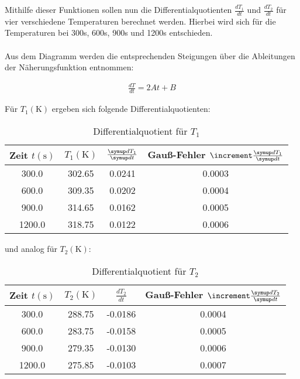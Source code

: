 Mithilfe dieser Funktionen sollen nun die Differentialquotienten $\frac{dT_{1}}{dt}$ und $\frac{dT_{2}}{dt}$ 
für vier verschiedene Temperaturen berechnet werden. Hierbei wird sich für die Temperaturen bei 
300s, 600s, 900s und 1200s entschieden. 
\\\\
Aus dem Diagramm werden die entsprechenden Steigungen über die Ableitungen der Näherungsfunktion entnommen:

\begin{align*} 
  \frac{dT}{dt} = 2At + B 
\end{align*}

Für $T_{1} (\unit{\kelvin})$ ergeben sich folgende Differentialquotienten:

\begin{table}
  \centering
  \caption{Differentialquotient für $T_{1}$}
  \label{tab:berechnete_werte_T1}
  \begin{tabular}{c c c c}
    \toprule
    {Zeit $t (\unit{\second})$} &
    {$T_{1} (\unit{\kelvin})$} &
    {$\frac{\dif{T_{1}}} {\dif{t}}$} & 
    {Gauß-Fehler $\increment \frac{\dif{T_{1}}} {\dif{t}}$}\\
    \midrule
     300.0 & 302.65 &  0.0241 &   0.0003 \\
     600.0 & 309.35 &  0.0202 &   0.0004 \\
     900.0 & 314.65 &  0.0162 &   0.0005 \\
    1200.0 & 318.75 &  0.0122 &   0.0006 \\
    \bottomrule
  \end{tabular}
\end{table}

und analog für $T_{2} (\unit{\kelvin})$:

\begin{table}
  \centering
  \caption{Differentialquotient für $T_{2}$}
  \label{tab:berechnete_werte_T2}
  \begin{tabular}{c c c c}
    \toprule
    {Zeit $t (\unit{\second})$} &
    {$T_{2} (\unit{\kelvin})$} &
    {$\frac{dT_{2}}{dt}$} &
    {Gauß-Fehler $\increment \frac{\dif{T_{2}}} {\dif{t}}$} \\
    \midrule
     300.0 & 288.75 & -0.0186 &   0.0004 \\
     600.0 & 283.75 & -0.0158 &   0.0005 \\
     900.0 & 279.35 & -0.0130 &   0.0006 \\
    1200.0 & 275.85 & -0.0103 &   0.0007 \\
    \bottomrule
  \end{tabular}
\end{table}

